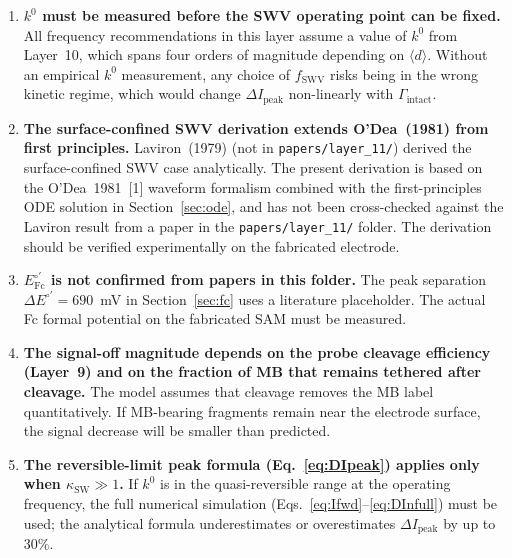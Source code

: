 \documentclass[10pt,a4paper]{article}
\numberwithin{equation}{section}
\newcommand{\cit}[1]{[#1]}
\newcommand{\Eo}{E^{\circ\prime}}
\newcommand{\Gtot}{\Gamma_{\text{intact}}}
\newcommand{\DI}{\Delta I}
\begin{document}
\begin{enumerate}[leftmargin=*]

  \item \textbf{$k^0$ must be measured before the SWV operating point
    can be fixed.}
    All frequency recommendations in this layer assume a value of $k^0$
    from Layer~10, which spans four orders of magnitude depending on
    $\langle d \rangle$. Without an empirical $k^0$ measurement, any
    choice of $f_{\text{SWV}}$ risks being in the wrong kinetic regime,
    which would change $\DI_{\text{peak}}$ non-linearly with $\Gtot$.

  \item \textbf{The surface-confined SWV derivation extends O'Dea~(1981)
    from first principles.}
    Laviron~(1979) (not in \texttt{papers/layer\_11/}) derived the
    surface-confined SWV case analytically. The present derivation
    is based on the O'Dea~1981~\cit{1} waveform formalism combined
    with the first-principles ODE solution in Section~\ref{sec:ode},
    and has not been cross-checked against the Laviron result from
    a paper in the \texttt{papers/layer\_11/} folder. The derivation
    should be verified experimentally on the fabricated electrode.

  \item \textbf{$\Eo_{\text{Fc}}$ is not confirmed from papers in
    this folder.}
    The peak separation $\Delta\Eo = 690$~mV in Section~\ref{sec:fc}
    uses a literature placeholder. The actual Fc formal potential on
    the fabricated SAM must be measured.

  \item \textbf{The signal-off magnitude depends on the probe cleavage
    efficiency (Layer~9) and on the fraction of MB that remains tethered
    after cleavage.}
    The model assumes that cleavage removes the MB label quantitatively.
    If MB-bearing fragments remain near the electrode surface, the signal
    decrease will be smaller than predicted.

  \item \textbf{The reversible-limit peak formula (Eq.~\ref{eq:DIpeak})
    applies only when $\kappa_{\text{SW}} \gg 1$.}
    If $k^0$ is in the quasi-reversible range at the operating frequency,
    the full numerical simulation (Eqs.~\ref{eq:Ifwd}--\ref{eq:DInfull})
    must be used; the analytical formula underestimates or overestimates
    $\DI_{\text{peak}}$ by up to 30\%.

\end{enumerate}
\end{document}
